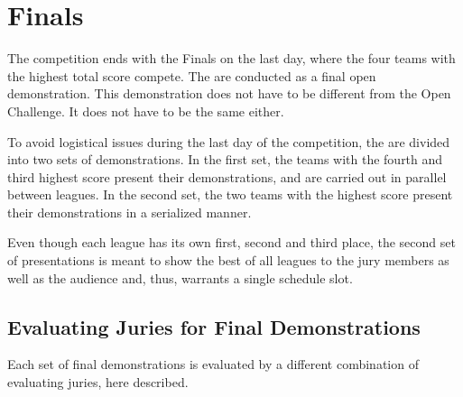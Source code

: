 \chapter{Finals}

The competition ends with the Finals on the last day, where the four teams with the highest total score compete.
The  are conducted as a final open demonstration.
This demonstration does not have to be different from the Open Challenge. 
It does not have to be the same either.

To avoid logistical issues during the last day of the competition, the  are divided into two sets of demonstrations.
In the first set, the teams with the fourth and third highest score present their demonstrations, and are carried out in parallel between leagues.
In the second set, the two teams with the highest score present their demonstrations in a serialized manner.

Even though each league has its own first, second and third place, the second set of presentations is meant to show the best of all leagues to the jury members as well as the audience and, thus, warrants a single schedule slot.

\section{Evaluating Juries for Final Demonstrations}
Each set of final demonstrations is evaluated by a different combination of evaluating juries, here described.

